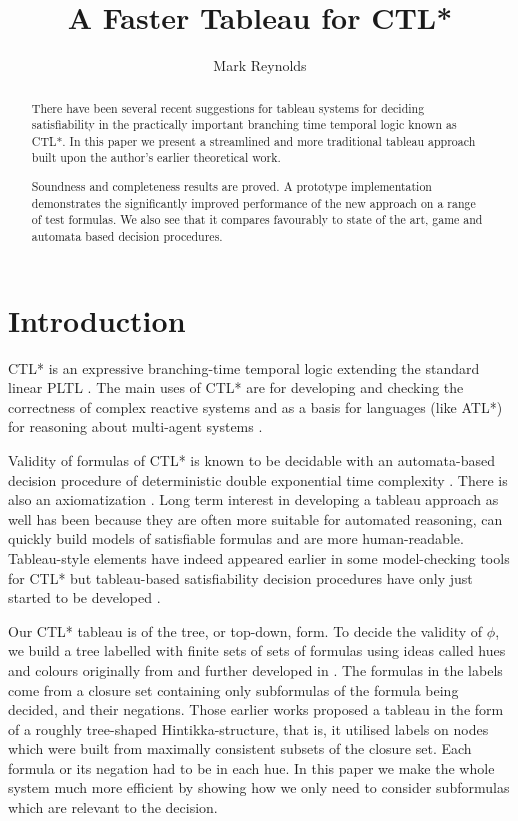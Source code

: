 \documentclass[submission,copyright,creativecommons]{eptcs}
\title{A Faster Tableau for CTL*}
\author{Mark Reynolds
\institute{School of Computer Science and Software Engineering,
The University of Western Australia}
\email{mark.reynolds@uwa.edu.au}
}
\begin{document}
\maketitle


\begin{abstract}
There have been several recent suggestions for tableau systems for
deciding satisfiability in the practically important branching time
temporal logic known as CTL*.
In this paper we present a streamlined and more traditional tableau
approach built upon the author's earlier theoretical work.

Soundness and completeness results are proved. A prototype implementation
demonstrates the significantly improved performance of the new approach on
a range of test formulas.
We also see that it compares favourably  to state of the art, game and automata based
decision procedures.
\end{abstract}







\section{Introduction}
\label{sec:intro}
CTL* \cite{+emsi,+emhal86}
is an expressive branching-time
temporal logic 
extending the standard
linear 
PLTL \cite{Pnu77}.
The main uses of CTL*
are
for developing and checking the
correctness of complex
reactive systems  \cite{Eme90}
and as a basis for
languages (like ATL*)
for reasoning about multi-agent systems 
\cite{DBLP:conf/lfcs/GorankoS09}.

Validity of
formulas of CTL* is known to be decidable
with an automata-based decision procedure
of deterministic double exponential
time complexity \cite{+emsi,EJ88,VaS85}.
There is also an axiomatization \cite{Rey:ctlstar}.
Long term interest in 
developing a tableau approach as well
has been because they
are often more suitable for automated reasoning,
can quickly build
models of satisfiable formulas
and are more human-readable.
Tableau-style elements 
have indeed appeared earlier in some model-checking
tools for CTL*
but 
tableau-based satisfiability
decision procedures have only
just started to be developed
\cite{Rey:startab,FLL10}.

Our CTL* tableau
is of the 
tree, or top-down, form.
To decide the validity of $\phi$,
we build a tree
labelled with finite
sets of sets of formulas
using ideas called hues and colours originally from
\cite{Rey:ctlstar}
and further developed
in \cite{Rey:startabFM,Rey:startab}.
The formulas
in the labels come from a closure set containing
only subformulas of the formula being decided,
and their negations.
Those earlier works proposed
a tableau in the form of a roughly tree-shaped
Hintikka-structure,
that is,
it utilised labels on nodes which were
built from maximally consistent subsets of 
the closure set.
Each formula or its negation had to be in 
each hue.
In this paper we make the whole 
system much more efficient
by showing how we only need to 
consider subformulas
which are relevant to the decision.
\end{document}

